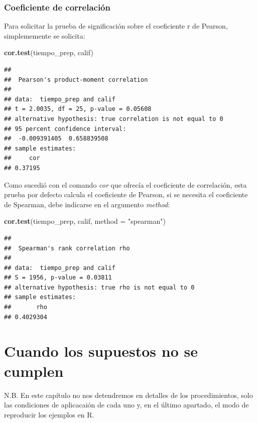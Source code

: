 \documentclass[]{book}
\newenvironment{Shaded}{\begin{snugshade}}{\end{snugshade}}
\newcommand{\DataTypeTok}[1]{\textcolor[rgb]{0.13,0.29,0.53}{#1}}
\newcommand{\KeywordTok}[1]{\textcolor[rgb]{0.13,0.29,0.53}{\textbf{#1}}}
\newcommand{\NormalTok}[1]{#1}
\newcommand{\StringTok}[1]{\textcolor[rgb]{0.31,0.60,0.02}{#1}}
\begin{document}
\hypertarget{coeficiente-de-correlaciuxf3n}{%
\subsection{Coeficiente de correlación}\label{coeficiente-de-correlaciuxf3n}}

Para solicitar la prueba de significación sobre el coeficiente r de Pearson, simplememente se solicita:

\begin{Shaded}
\begin{Highlighting}[]
\KeywordTok{cor.test}\NormalTok{(tiempo_prep, calif)}
\end{Highlighting}
\end{Shaded}

\begin{verbatim}
## 
##  Pearson's product-moment correlation
## 
## data:  tiempo_prep and calif
## t = 2.0035, df = 25, p-value = 0.05608
## alternative hypothesis: true correlation is not equal to 0
## 95 percent confidence interval:
##  -0.009391405  0.658839508
## sample estimates:
##     cor 
## 0.37195
\end{verbatim}

Como sucedió con el comando \emph{cor} que ofrecía el coeficiente de correlación, esta prueba por defecto calcula el coeficiente de Pearson, si se necesita el coeficiente de Spearman, debe indicarse en el argumento \emph{method}:

\begin{Shaded}
\begin{Highlighting}[]
\KeywordTok{cor.test}\NormalTok{(tiempo_prep, calif, }\DataTypeTok{method =} \StringTok{"spearman"}\NormalTok{)}
\end{Highlighting}
\end{Shaded}

\begin{verbatim}
## 
##  Spearman's rank correlation rho
## 
## data:  tiempo_prep and calif
## S = 1956, p-value = 0.03811
## alternative hypothesis: true rho is not equal to 0
## sample estimates:
##       rho 
## 0.4029304
\end{verbatim}

\hypertarget{cuando-los-supuestos-no-se-cumplen}{%
\chapter{Cuando los supuestos no se cumplen}\label{cuando-los-supuestos-no-se-cumplen}}

N.B. En este capítulo no nos detendremos en detalles de los procedimientos, solo las condiciones de aplicacaión de cada uno y, en el último apartado, el modo de reproducir los ejemplos en R.
\end{document}
